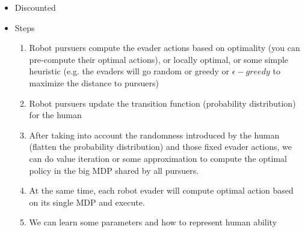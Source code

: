 \begin{itemize}
    \item Discounted\\
    \item Steps
    \begin{enumerate}
        \item Robot pursuers compute the evader actions based on optimality (you can pre-compute their optimal actions), or locally optimal, or some simple heuristic (e.g. the evaders will go random or greedy or $\epsilon-greedy$ to maximize the distance to pursuers)
        \item Robot pursuers update the transition function (probability distribution) for the human
        \item After taking into account the randomness introduced by the human (flatten the probability distribution) and those fixed evader actions, we can do value iteration or some approximation to compute the optimal policy in the big MDP shared by all pursuers.
        \item At the same time, each robot evader will compute optimal action based on its single MDP and execute.
        \item We can learn some parameters and how to represent human ability
    \end{enumerate}
\end{itemize}



